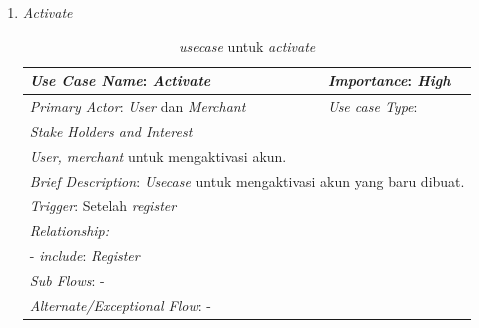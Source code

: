 \documentclass[a4paper]{article}
\begin{document}
\begin{enumerate}
\begin{enumerate}
        \item \textit{Activate}
            \begin{table}[h]
                \centering
                \caption{\textit{usecase} untuk \textit{activate}}
                \begin{tabular}{|lll}
                \hline
                \multicolumn{1}{|l|}{\textit{Use Case Name}: \textit{Activate}}             & \multicolumn{2}{l|}{\textit{Importance}: \textit{High}}   \\ \hline
                \multicolumn{1}{|l|}{\textit{Primary Actor}: \textit{User} dan \textit{Merchant}}             & \multicolumn{2}{l|}{\textit{Use case Type}:} \\ \hline
                \multicolumn{1}{|l|}{\textit{Stake Holders and Interest}} &                               &                               \\ \cline{1-1}
                \multicolumn{1}{|l|}{\textit{User, merchant}  untuk mengaktivasi akun.}                                                     &                               &                               \\ \hline
                \multicolumn{3}{|l|}{\textit{Brief Description}: \textit{Usecase} untuk mengaktivasi akun yang baru dibuat.}                                                                         \\ \hline
                \multicolumn{3}{|l|}{\textit{Trigger}: Setelah \textit{register}}                                                                                   \\ \hline
                \multicolumn{3}{|l|}{\textit{Relationship:}}                                                                              \\ \hline
                \multicolumn{3}{|l|}{- \textit{include}: \textit{Register}}                                                                                                                     \\ \hline
                \multicolumn{3}{|l|}{\textit{Sub Flows}: -}                                                                                 \\ \hline
                \multicolumn{3}{|l|}{\textit{Alternate/Exceptional Flow}: -}                                                                \\ \hline
                \end{tabular}
            \end{table}


\end{enumerate}
\end{enumerate}
\end{document}
